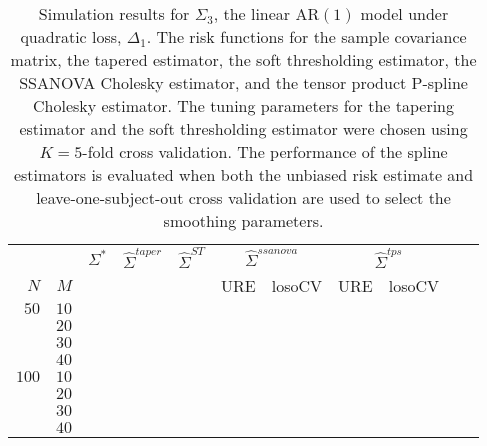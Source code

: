 \documentclass[12pt]{article}
\newcommand{\ra}[1]{\renewcommand{\arraystretch}{#1}}
\theoremstyle{definition}
\begin{document}
\begin{table}\centering
\ra{1.3}
\caption{Simulation results for $\Sigma_3$, the linear $\mbox{AR}\left(1\right)$ model under quadratic loss, $\Delta_1$. The risk functions for the sample covariance matrix, the tapered estimator, the soft thresholding estimator, the SSANOVA Cholesky estimator, and the tensor product P-spline Cholesky estimator. The tuning parameters for the tapering estimator and the soft thresholding estimator were chosen using $K = 5$-fold cross validation. The performance of the spline estimators is evaluated when both the unbiased risk estimate and leave-one-subject-out cross validation are used to select the smoothing parameters.}
\begin{tabular}{@{}rrrcrcrrcrr@{}}\toprule
   &            & \multicolumn{1}{c}{$\Sigma^*$}  & \multicolumn{1}{c}{$\hat{\Sigma}^{taper}$} &\multicolumn{1}{c}{$\hat{\Sigma}^{ST}$} &\multicolumn{2}{c}{ $\hat{\Sigma}^{ssanova}$} &  \multicolumn{2}{c}{ $\hat{\Sigma}^{tps}$}\\
$N$ & $M$ 	&	  &	& & \multicolumn{1}{c}{\mbox{URE}} & \multicolumn{1}{c}{\mbox{losoCV}} &\multicolumn{1}{c}{\mbox{URE}} & \multicolumn{1}{c}{\mbox{losoCV}}\\ \midrule
$50$ & $10$\\
  & $20$  &&&&&&&\\
  & $30$   &&&&&&&\\
& $40$   &&&&&&&\\ 
$100$ & $10$ &&&&&&&\\
& $20$  &&&&&&& \\
& $30$  &&&&&&& \\
& $40$  &&&&&&& \\ 
\bottomrule
\end{tabular}
\end{table}
\end{document}
